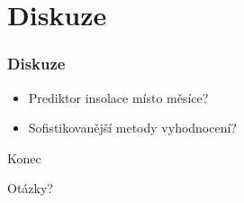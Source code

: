 \documentclass[
	11pt, %
]{beamer}
\begin{document}
\section{Diskuze}

\begin{frame}
	\frametitle{Diskuze}
	\begin{itemize}
		\item Prediktor insolace místo měsíce?
		\item Sofistikovanější metody vyhodnocení?
	\end{itemize}
\end{frame}



\begin{frame}[plain] %
	\begin{center}
		{\Huge Konec}
		
		\bigskip\bigskip %
		
		{\LARGE Otázky?}
	\end{center}
\end{frame}

\end{document}
